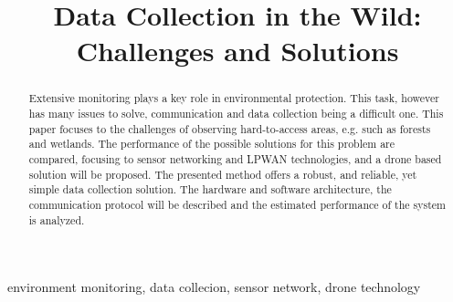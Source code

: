 \documentclass[conference]{IEEEtran}
\begin{document}
\title{Data Collection in the Wild:\\Challenges and Solutions}

\author{
\and
{}
\and
{}
}


\maketitle

\begin{abstract}

Extensive monitoring plays a key role in environmental protection. This task, however
has many issues to solve, communication and data collection being a difficult one.
This paper focuses to the challenges of observing hard-to-access areas, e.g.
such as forests and wetlands. The performance of the possible solutions for this problem
are compared, focusing to sensor networking and LPWAN technologies, and a drone based solution
will be proposed. The presented method offers a robust, and reliable, yet simple
data collection solution. The hardware and software architecture, the communication protocol
will be described and the estimated performance of the system is analyzed.


\end{abstract}

\begin{IEEEkeywords}
environment monitoring, data collecion, sensor network, drone technology
\end{IEEEkeywords}
\end{document}

